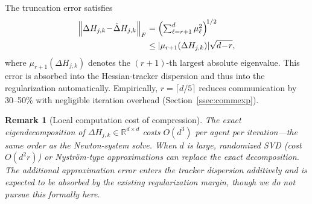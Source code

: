 \documentclass[11pt,a4paper]{article}
\def\cO{O}%
\newtheorem{remark}[theorem]{Remark}
\newcommand{\R}{\mathbb{R}}
\newcommand{\normF}[1]{\left\|#1\right\|_F}
\newcommand{\cO}{\mathcal{O}}
\begin{document}
The truncation error satisfies
\begin{align*}
\normF{\Delta H_{j,k}\!-\!\hat\Delta H_{j,k}}
&=\Bigl(\textstyle\sum_{\ell=r+1}^d \mu_\ell^2\Bigr)^{\!1/2}\\
&\le |\mu_{r+1}(\Delta H_{j,k})|\sqrt{d\!-\!r},
\end{align*}
where $\mu_{r+1}(\Delta H_{j,k})$ denotes the $(r+1)$-th largest absolute eigenvalue.
This error is absorbed into the Hessian-tracker dispersion and thus into the regularization automatically.
Empirically, $r=\lceil d/5\rceil$ reduces communication by 30--50\% with negligible iteration overhead
(Section~\ref{ssec:commexp}).

\begin{remark}[Local computation cost of compression]
The exact eigendecomposition of $\Delta H_{j,k}\in\R^{d\times d}$
costs $\cO(d^3)$ per agent per iteration---the same order as the
Newton-system solve.
When $d$ is large, randomized SVD
(cost $\cO(d^2 r)$) or Nystr\"om-type approximations can replace
the exact decomposition.
The additional approximation error enters the tracker dispersion
additively and is expected to be absorbed by the existing
regularization margin, though we do not pursue this formally here.
\end{remark}
	
\end{document}
